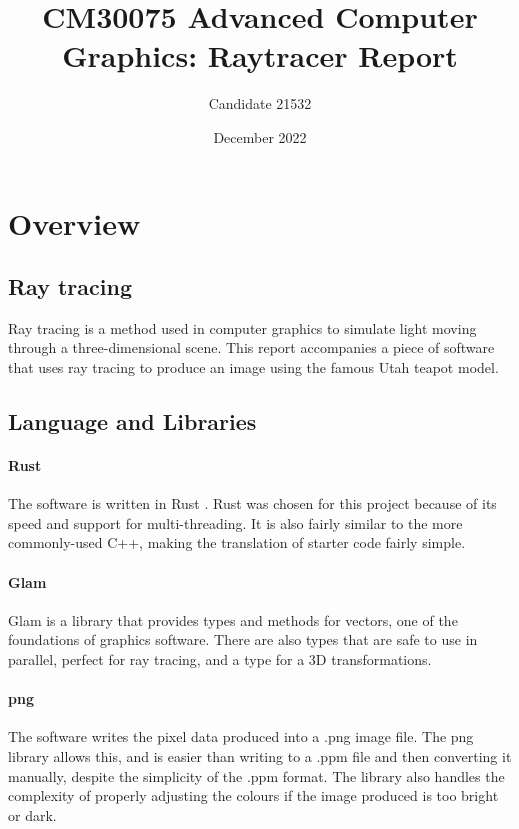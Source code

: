 \documentclass[a4paper]{article}
\title{CM30075 Advanced Computer Graphics: Raytracer Report}
\author{Candidate 21532}
\date{December 2022}
\begin{document}
\maketitle
\tableofcontents


\section{Overview}
\subsection{Ray tracing}
Ray tracing is a method used in computer graphics to simulate light moving through a three-dimensional scene. This report accompanies a piece of software that uses ray tracing to produce an image using the famous Utah teapot model.

\subsection{Language and Libraries}
\paragraph{Rust} The software is written in Rust \cite{}. Rust was chosen for this project because of its speed and support for multi-threading. It is also fairly similar to the more commonly-used C++, making the translation of starter code fairly simple.

\paragraph{Glam} Glam is a library that provides types and methods for vectors, one of the foundations of graphics software. There are also types that are safe to use in parallel, perfect for ray tracing, and a type for a 3D transformations.

\paragraph{png} The software writes the pixel data produced into a .png image file. The png library allows this, and is easier than writing to a .ppm file and then converting it manually, despite the simplicity of the .ppm format. The library also handles the complexity of properly adjusting the colours if the image produced is too bright or dark.
\end{document}
